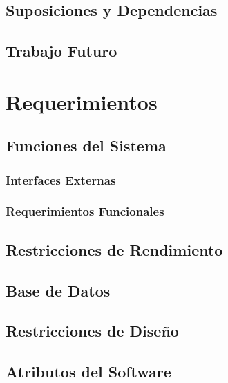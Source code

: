 \documentclass[10pt,a4paper,english,spanish]{article}
\begin{document}
\subsection{Suposiciones y Dependencias}
\subsection{Trabajo Futuro}


\section{Requerimientos}
\label{section-req} 

\subsection{Funciones del Sistema}
	\subsubsection{Interfaces Externas}
	\subsubsection{Requerimientos Funcionales}
\subsection{Restricciones de Rendimiento}
\subsection{Base de Datos}
\subsection{Restricciones de Diseño}
\subsection{Atributos del Software}
\end{document}
